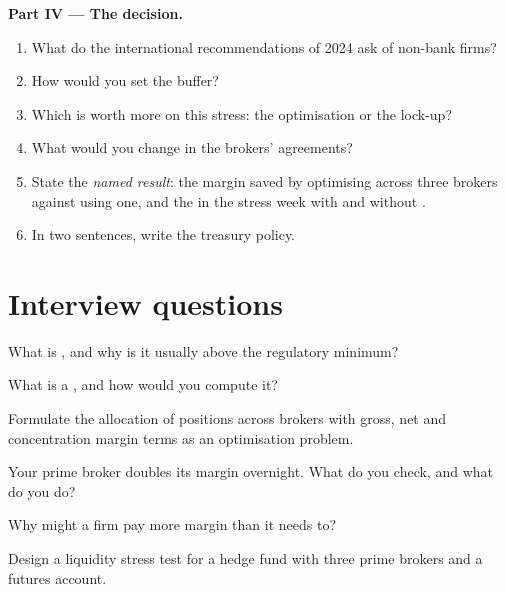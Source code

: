 \begin{problem}
\medskip\noindent\textbf{Part IV --- The decision.}
\begin{enumerate}[resume]
\item What do the international recommendations of 2024 ask of non-bank firms?
\item How would you set the buffer?
\item Which is worth more on this stress: the optimisation or the lock-up?
\item What would you change in the brokers' agreements?
\item State the \emph{named result}: the margin saved by optimising across three brokers against using one, and the  in the stress
week with and without .
\item In two sentences, write the treasury policy.
\end{enumerate}
\end{problem}

\section{Interview questions}

\begin{interviewq}\label{iq:fm:treasury-and-funding:1}
What is , and why is it usually above the regulatory minimum?
\end{interviewq}

\begin{interviewq}\label{iq:fm:treasury-and-funding:2}
What is a , and how would you compute it?
\end{interviewq}

\begin{interviewq}\label{iq:fm:treasury-and-funding:3}
Formulate the allocation of positions across brokers with gross, net and concentration margin terms as an optimisation problem.
\end{interviewq}

\begin{interviewq}\label{iq:fm:treasury-and-funding:4}
Your prime broker doubles its margin overnight. What do you check, and what do you do?
\end{interviewq}

\begin{interviewq}\label{iq:fm:treasury-and-funding:5}
Why might a firm pay more margin than it needs to?
\end{interviewq}

\begin{interviewq}\label{iq:fm:treasury-and-funding:6}
Design a liquidity stress test for a hedge fund with three prime brokers and a futures account.
\end{interviewq}
